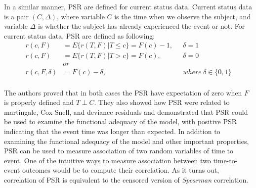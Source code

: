 \documentclass[]{article}
\begin{document}
In a similar manner, PSR are defined for current status data. Current status data is a pair $(C, \Delta)$, where variable $C$ is the time when we observe the subject, and variable $\Delta$ is whether the subject has already experienced the event or not. For current status data, PSR are defined as following:
	$$
	\begin{aligned}
		r(c, F) &= E\{r(T,F)|T\leq c\} = F(c) - 1,~~~&\delta = 1 \\
		r(c, F) &= E\{r(T,F)|T>c\} = F(c) ,~~~&\delta = 0 \\
		&or\\
    r(c, F, \delta) &= F(c) - \delta,~~~&where~\delta \in \{0,1\}\\
	\end{aligned}
	$$

The authors proved that in both cases the PSR have expectation of zero when $F$ is properly defined and $T \perp C$. They also showed how PSR were related to martingale, Cox-Snell, and deviance residuals and demonstrated that PSR could be used to examine the functional adequacy of the model, with positive PSR indicating that the event time was longer than expected. In addition to examining the functional adequacy of the model and other important properties, PSR can be used to measure association of two random variables of time to event. One of the intuitive ways to measure association between two time-to-event outcomes would be to compute their correlation. As it turns out, correlation of PSR is equivalent to the censored version of \emph{Spearman} correlation.
\end{document}
